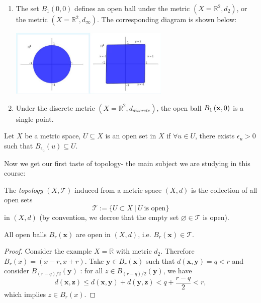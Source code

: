 \begin{example} \begin{enumerate}
    \item The set \({B}_{1}\left( {0,0}\right)\) defines an open ball under the metric \(\left( {X = {\mathbb{R}}^{2},{d}_{2}}\right)\), or the metric \(\left( {X = {\mathbb{R}}^{2},{d}_{\infty }}\right)\). The corresponding diagram is shown below:
\begin{center}
\includegraphics[width=0.6\textwidth]{images/ch1_ball_square.jpg}
\end{center}

\item Under the discrete metric \(({X = {\mathbb{R}}^{2}}, d_{discrete})\), the open ball \({B}_{1}\left( {{\bf x},0}\right)\) is a single point.
\end{enumerate}
\end{example}

\begin{definition} \label{def:open_set} Let \(X\) be a metric space, \(U \subseteq  X\) is an open set in \(X\) if \(\forall u \in  U\), there exists \({\epsilon }_{u} > 0\) such that \({B}_{{\epsilon }_{u}}\left( u\right)  \subseteq  U\).
\end{definition}

Now we get our first taste of topology- the main subject we are studying in this course:
\begin{definition} The \emph{topology} $(X, \mathcal{T})$ induced from a metric space $(X, d)$ is the collection of all open sets 
$$\mathcal{T} := \{ U \subset X\ |\ U\ \text{is open}\}$$ 
in $(X, d)$ (by convention, we decree that the empty set \(\varnothing \in \mathcal{T}\) is open).
\end{definition}

\begin{proposition} All open balls \({B}_{r}\left( \mathbf{x}\right)\) are open in $(X, d)$, i.e. ${B}_{r}\left( \mathbf{x}\right) \in \mathcal{T}$.
\end{proposition}

\begin{proof} Consider the example \(X = \mathbb{R}\) with metric \({d}_{2}\). Therefore \({B}_{r}\left( x\right)  = \left( {x- r,x + r}\right)\). Take \(\mathbf{y} \in  {B}_{r}\left( \mathbf{x}\right)\) such that \(d\left( {\mathbf{x},\mathbf{y}}\right)  = q < r\) and consider \({B}_{\left( {r- q}\right) /2}\left( \mathbf{y}\right)\) : for all \(z \in  {B}_{\left( {r- q}\right) /2}\left( \mathbf{y}\right)\), we have
\[
d\left( {\mathbf{x},\mathbf{z}}\right)  \leq  d\left( {\mathbf{x},\mathbf{y}}\right)  + d\left( {\mathbf{y},\mathbf{z}}\right)  < q + \frac{r- q}{2} < r,
\]
which implies \(z \in  {B}_{r}\left( x\right)\).
\end{proof}

